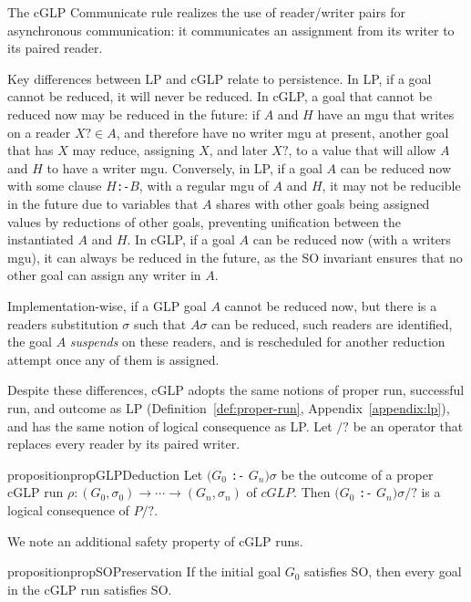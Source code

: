 The cGLP Communicate rule realizes the use of reader/writer pairs for asynchronous communication: it communicates an assignment from its writer to its paired reader.


Key differences between LP and cGLP relate to persistence. In LP, if a goal cannot be reduced, it will never be reduced. In cGLP, a goal that cannot be reduced now may be reduced in the future: if $A$ and $H$ have an mgu that writes on a reader $X? \in A$, and therefore have no writer mgu at present,  another goal that has $X$ may reduce, assigning $X$, and later $X?$, to a value that will allow $A$ and $H$ to have a writer mgu. Conversely, in LP, if a goal $A$ can be reduced now with some clause $H$\verb|:-|$B$, with a regular mgu of $A$ and $H$, it may not be reducible in the future due to variables that $A$ shares with other goals being assigned values by reductions of other goals, preventing unification between the instantiated $A$ and $H$. In cGLP, if a goal $A$ can be reduced now (with a writers mgu), it can always be reduced in the future, as the SO invariant ensures that no other goal can assign any writer in $A$.

Implementation-wise, if a GLP goal $A$ cannot be reduced now, but there is a readers substitution $\sigma$ such that $A\sigma$ can be reduced, such readers are identified, the goal $A$ \emph{suspends} on these readers, and is rescheduled for another reduction attempt once any of them is assigned.

Despite these differences, cGLP adopts the same notions of proper run, successful run, and outcome as LP\ifappendix{} (Definition~\ref{def:proper-run}, Appendix~\ref{appendix:lp})\fi, and has the same notion of logical consequence as LP. Let $/?$ be an operator that replaces every reader by its paired writer.

\begin{restatable}{proposition}{propGLPDeduction}
\label{prop:cglp-deduction}
Let $(G_0$ \texttt{:-} $G_n)\sigma$ be the outcome of a proper cGLP run $\rho: (G_0,\sigma_0) \rightarrow \cdots \rightarrow (G_n, \sigma_n)$ of $cGLP$. Then $(G_0$ \texttt{:-} $G_n)\sigma/?$ is a logical consequence of $P/?$.
\end{restatable}

We note an additional safety property of cGLP runs.

\begin{restatable}[SO Preservation]{proposition}{propSOPreservation}
\label{prop:so-preservation}
If the initial goal $G_0$ satisfies SO, then every goal in the cGLP run satisfies SO.
\end{restatable}

